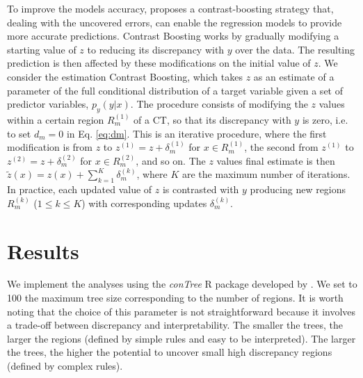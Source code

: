 \documentclass[fleqn,10pt]{wlscirep}
\begin{document}
To improve the models accuracy, \cite{Friedman2020} proposes a contrast-boosting strategy that, dealing with the uncovered errors, can enable the regression models to provide more accurate predictions. 
Contrast Boosting works by gradually modifying a starting value of $z$ to reducing its discrepancy with $y$ over the data. The resulting prediction is then affected by these modifications on the initial value of $z$.
We consider the estimation Contrast Boosting, which takes $z$ as an estimate of a parameter of the full conditional distribution of a target variable given a set of predictor variables, $p_y(y | x)$.
The procedure consists of modifying the $z$ values within a certain region $R_m^{(1)}$ of a CT, so that its discrepancy with $y$ is zero, i.e. to set $d_m=0$ in Eq. \ref{eq:dm}.
This is an iterative procedure, where the first modification is from $z$ to $z^{(1)}=z+\delta^{(1)}_m$ for $x\in R^{(1)}_m$, the second from $z^{(1)}$ to $z^{(2)}=z+\delta^{(2)}_m$ for $x\in R^{(2)}_m$, and so on.
The $z$ values final estimate is then $\tilde{z}(x)=z(x)+\sum_{k=1}^{K}\delta_{m}^{(k)}$, where $K$ are the maximum number of iterations. In practice, each updated value of $z$ is contrasted with $y$ producing new regions $R^{(k)}_m$ ($1\leq k\leq K$) with corresponding updates $\delta_{m}^{(k)}$.

\section*{Results}

We implement the analyses using the \textit{conTree} R package developed by \cite{FriedmanNarasimhan2020}.
We set to 100 the maximum tree size corresponding to the number of regions. It is worth noting that the choice of this parameter is not straightforward because it involves a trade-off between discrepancy and interpretability. The smaller the trees, the larger the regions (defined by simple rules and easy to be interpreted). The larger the trees, the higher the potential to uncover small high discrepancy regions (defined by complex rules).
\end{document}
